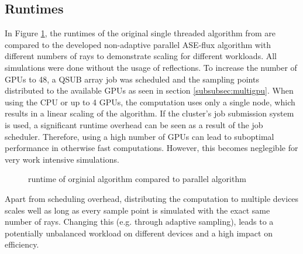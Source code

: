 \subsection{Runtimes}
In Figure \ref{plot:runtime}, the runtimes of the original single threaded
algorithm from \cite{ASE2010} are compared to the developed non-adaptive
parallel ASE-flux algorithm with different numbers of rays to demonstrate
scaling for different workloads. All simulations were done without the usage
of reflections. To increase the number of GPUs to 48, a QSUB
array job was scheduled and the sampling points distributed to the available
GPUs as seen in section \ref{subsubsec:multigpu}.  When using the CPU or up to 4
GPUs, the computation uses only a single node, which results in a linear scaling
of the algorithm. If the cluster's job submission system is used, a significant
runtime overhead can be seen as a result of the job scheduler. Therefore, using
a high number of GPUs can lead to suboptimal performance in otherwise fast
computations. However, this becomes neglegible for very work intensive
simulations.
\begin{figure}[H]
  \centerline{
    }
  \caption{runtime of orginial algorithm compared to parallel algorithm}
  \label{plot:runtime}
\end{figure}
Apart from scheduling overhead, distributing the computation to multiple devices
scales well as long as every sample point is simulated with the exact same
number of rays. Changing this (e.g. through adaptive sampling), leads to a
potentially unbalanced workload on different devices and a high impact on efficiency.
